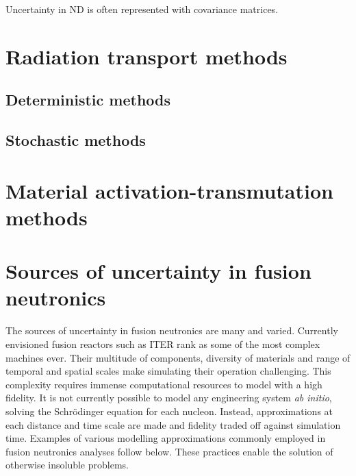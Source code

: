 Uncertainty in ND is often represented with covariance matrices.

\section{Radiation transport methods}
\subsection{Deterministic methods}
\subsection{Stochastic methods}

\section{Material activation-transmutation methods}

\section{Sources of uncertainty in fusion neutronics}
The sources of uncertainty in fusion neutronics are many and varied. Currently envisioned fusion reactors such as ITER rank as some of the most complex machines ever. Their multitude of components, diversity of materials and range of temporal and spatial scales make simulating their operation challenging. This complexity requires immense computational resources to model with a high fidelity. It is not currently possible to model any engineering system \textit{ab initio}, solving the Schr{\"o}dinger equation for each nucleon. Instead, approximations at each distance and time scale are made and fidelity traded off against simulation time. Examples of various modelling approximations commonly employed in fusion neutronics analyses follow below. These practices enable the solution of otherwise insoluble problems.  


